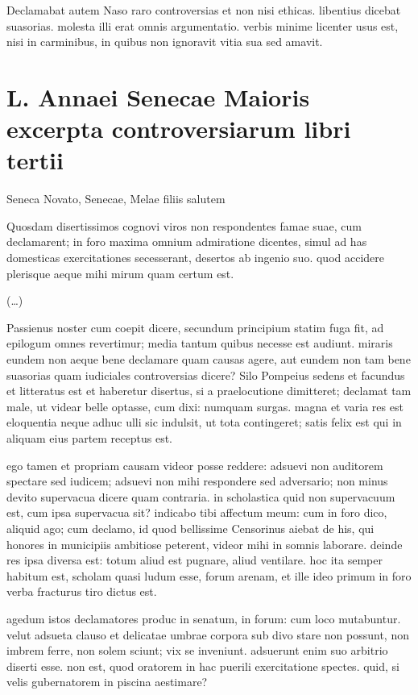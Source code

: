 Declamabat autem Naso raro controversias et non nisi ethicas. libentius dicebat suasorias. molesta illi erat omnis argumentatio. verbis minime licenter usus est, nisi in carminibus, in quibus non ignoravit vitia sua sed amavit.

\section*{L. Annaei Senecae Maioris \\excerpta controversiarum libri tertii}

Seneca Novato, Senecae, Melae filiis salutem

\medskip

\noindent Quosdam disertissimos cognovi viros non respondentes famae suae, cum declamarent; in foro maxima omnium admiratione dicentes, simul ad has domesticas exercitationes secesserant, desertos ab ingenio suo. quod accidere plerisque aeque mihi mirum quam certum est. 

(\dots)
	
Passienus noster cum coepit dicere, secundum principium statim fuga fit, ad epilogum omnes revertimur; media tantum quibus necesse est audiunt. miraris eundem non aeque bene declamare quam causas agere, aut eundem non tam bene suasorias quam iudiciales controversias dicere? Silo Pompeius sedens et facundus et litteratus est et haberetur disertus, si a praelocutione dimitteret; declamat tam male, ut videar belle optasse, cum dixi: numquam surgas. magna et varia res est eloquentia neque adhuc ulli sic indulsit, ut tota contingeret; satis felix est qui in aliquam eius partem receptus est. 

ego tamen et propriam causam videor posse reddere: adsuevi non auditorem spectare sed iudicem; adsuevi non mihi respondere sed adversario; non minus devito supervacua dicere quam contraria. in scholastica quid non supervacuum est, cum ipsa supervacua sit? indicabo tibi affectum meum: cum in foro dico, aliquid ago; cum declamo, id quod bellissime Censorinus aiebat de his, qui honores in municipiis ambitiose peterent, videor mihi in somnis laborare. deinde res ipsa diversa est: totum aliud est pugnare, aliud ventilare. hoc ita semper habitum est, scholam quasi ludum esse, forum arenam, et ille ideo primum in foro verba fracturus tiro dictus est. 

agedum istos declamatores produc in senatum, in forum: cum loco mutabuntur. velut adsueta clauso et delicatae umbrae corpora sub divo stare non possunt, non imbrem ferre, non solem sciunt; vix se inveniunt. adsuerunt enim suo arbitrio diserti esse. non est, quod oratorem in hac puerili exercitatione spectes. quid, si velis gubernatorem in piscina aestimare? 

